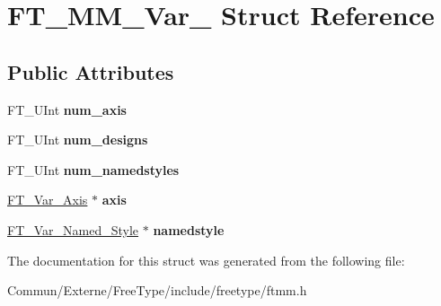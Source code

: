 \hypertarget{struct_f_t___m_m___var__}{}\section{F\+T\+\_\+\+M\+M\+\_\+\+Var\+\_\+ Struct Reference}
\label{struct_f_t___m_m___var__}
\subsection*{Public Attributes}
\begin{DoxyCompactItemize}
\item 
F\+T\+\_\+\+U\+Int {\bfseries num\+\_\+axis}\hypertarget{struct_f_t___m_m___var___acd32d4eb128f6fd9f6fde7da4c7b99bf}{}\label{struct_f_t___m_m___var___acd32d4eb128f6fd9f6fde7da4c7b99bf}

\item 
F\+T\+\_\+\+U\+Int {\bfseries num\+\_\+designs}\hypertarget{struct_f_t___m_m___var___a5109a6a20626d90ed44cd64363d29e92}{}\label{struct_f_t___m_m___var___a5109a6a20626d90ed44cd64363d29e92}

\item 
F\+T\+\_\+\+U\+Int {\bfseries num\+\_\+namedstyles}\hypertarget{struct_f_t___m_m___var___ac54bdd53447f4967b5d3b1a341a4bdff}{}\label{struct_f_t___m_m___var___ac54bdd53447f4967b5d3b1a341a4bdff}

\item 
\hyperlink{struct_f_t___var___axis__}{F\+T\+\_\+\+Var\+\_\+\+Axis} $\ast$ {\bfseries axis}\hypertarget{struct_f_t___m_m___var___a19cc7772e057dad1c4acd6e744328466}{}\label{struct_f_t___m_m___var___a19cc7772e057dad1c4acd6e744328466}

\item 
\hyperlink{struct_f_t___var___named___style__}{F\+T\+\_\+\+Var\+\_\+\+Named\+\_\+\+Style} $\ast$ {\bfseries namedstyle}\hypertarget{struct_f_t___m_m___var___acda1ec5211250ddc06ec090f695adabf}{}\label{struct_f_t___m_m___var___acda1ec5211250ddc06ec090f695adabf}

\end{DoxyCompactItemize}


The documentation for this struct was generated from the following file\+:\begin{DoxyCompactItemize}
\item 
Commun/\+Externe/\+Free\+Type/include/freetype/ftmm.\+h\end{DoxyCompactItemize}
